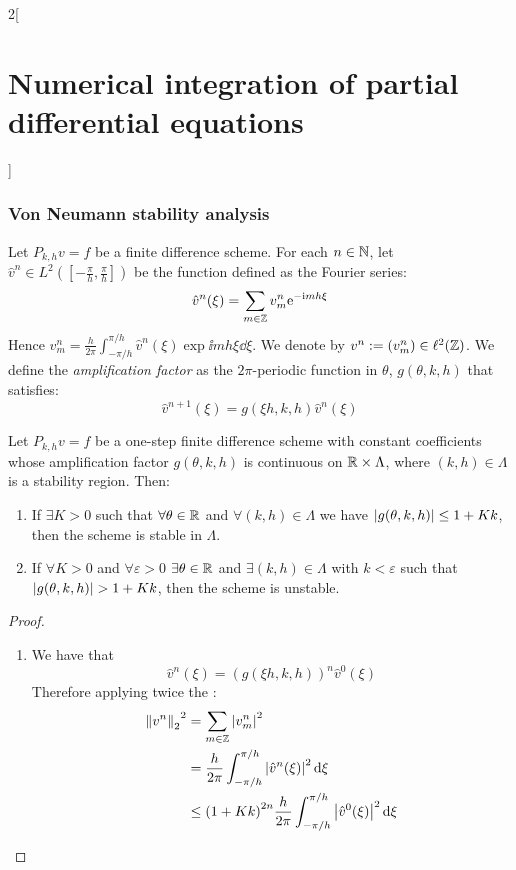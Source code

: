 \documentclass[../../../main_math.tex]{subfiles}
\begin{document}
\begin{multicols}{2}[\section{Numerical integration of partial differential equations}]
  \subsubsection{Von Neumann stability analysis}
  \begin{definition}
    Let $P_{k,h}{v}={f}$ be a finite difference scheme. For each $n\in\mathbb{N}$, let ${\hat{v}}^n\in L^2\left(\left[-\frac{\pi}{h},\frac{\pi}{h}\right]\right)$ be the function defined as the Fourier series: $${\hat{v}}^n(\xi)=\sum_{m\in\mathbb{Z}}{v}_{m}^n\mathrm{e}^{-\mathrm{i} m h \xi}$$ Hence $\displaystyle {v}_m^n=\frac{h}{2\pi}\int_{-\pi/h}^{\pi/h} {\hat{v}}^n(\xi)\exp{\ii mh \xi}\dd{\xi}$. We denote by ${v}^n:=({v}_m^n)\in\ell^2(\mathbb{Z})$. We define the \emph{amplification factor} as the $2\pi$-periodic function in $\theta$, $g(\theta, k, h)$ that satisfies:
    $${\hat{v}}^{n+1}(\xi)=g(\xi h,k,h){\hat{v}}^n(\xi)$$
  \end{definition}
  \begin{theorem}
    Let $P_{k,h}{v}={f}$ be a one-step finite difference scheme with constant coefficients whose amplification factor $g(\theta,k,h)$ is continuous on $\mathbb{R}\times\Lambda$, where $(k,h)\in\Lambda$ is a stability region. Then:
    \begin{enumerate}
      \item If $\exists K>0$ such that $\forall\theta\in\mathbb{R}$ and $\forall(k,h)\in\Lambda$ we have $\abs{g(\theta,k,h)}\leq 1+Kk$, then the scheme is stable in $\Lambda$.
      \item If $\forall K>0$ and $\forall\varepsilon>0$ $\exists\theta\in\mathbb{R}$ and $\exists(k,h)\in\Lambda$ with $k<\varepsilon$ such that $\abs{g(\theta, k,h)}>1+Kk$, then the scheme is unstable.
    \end{enumerate}
  \end{theorem}
  \begin{proof}
    \begin{enumerate}
      \item We have that $${\hat{v}}^{n}(\xi)={(g(\xi h,k,h))}^n{\hat{v}}^0(\xi)$$ Therefore applying twice the :
            \begin{align*}
              {\norm{{v}^n}_2}^2 & =\sum_{m\in\ZZ}\abs{{v}_m^n}^2                                                      \\
                                 & =\frac{h}{2\pi}\int_{-\pi/h}^{\pi/h} \abs{\hat{v}^n(\xi)}^2\dd{\xi}                 \\
                                 & \leq{(1+Kk)}^{2n}\frac{h}{2\pi}\int_{-\pi/h}^{\pi/h} \abs{\hat{v}^0(\xi)}^2\dd{\xi} \\

\end{align*}
\end{enumerate}
\end{proof}
\end{multicols}
\end{document}
